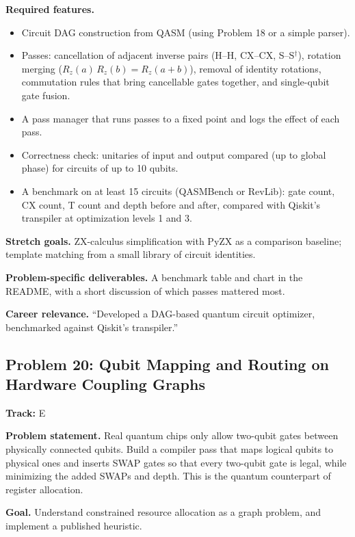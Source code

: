 \documentclass[11pt,a4paper]{article}
\newcommand{\fld}[1]{\par\smallskip\textbf{\color{accent}#1}\quad}
\newcommand{\meta}[1]{%
  \begin{tcolorbox}[colback=softbg,colframe=softbg,boxsep=2pt,left=4pt,right=4pt,top=2pt,bottom=2pt,arc=2pt]
  \small\textbf{Track:} #1
  \end{tcolorbox}}
\begin{document}
\fld{Required features.}
\begin{itemize}
  \item Circuit DAG construction from QASM (using Problem 18 or a simple parser).
  \item Passes: cancellation of adjacent inverse pairs (H--H, CX--CX, S--S$^\dagger$), rotation merging ($R_z(a)\,R_z(b) = R_z(a+b)$), removal of identity rotations, commutation rules that bring cancellable gates together, and single-qubit gate fusion.
  \item A pass manager that runs passes to a fixed point and logs the effect of each pass.
  \item Correctness check: unitaries of input and output compared (up to global phase) for circuits of up to 10 qubits.
  \item A benchmark on at least 15 circuits (QASMBench or RevLib): gate count, CX count, T count and depth before and after, compared with Qiskit's transpiler at optimization levels 1 and 3.
\end{itemize}

\fld{Stretch goals.} ZX-calculus simplification with PyZX as a comparison baseline; template matching from a small library of circuit identities.

\fld{Problem-specific deliverables.} A benchmark table and chart in the README, with a short discussion of which passes mattered most.

\fld{Career relevance.} ``Developed a DAG-based quantum circuit optimizer, benchmarked against Qiskit's transpiler.''

\subsection{Problem 20: Qubit Mapping and Routing on Hardware Coupling Graphs}
\meta{E}

\fld{Problem statement.} Real quantum chips only allow two-qubit gates between physically connected
qubits. Build a compiler pass that maps logical qubits to physical ones and inserts SWAP gates so
that every two-qubit gate is legal, while minimizing the added SWAPs and depth. This is the quantum
counterpart of register allocation.

\fld{Goal.} Understand constrained resource allocation as a graph problem, and implement a published heuristic.
\end{document}
